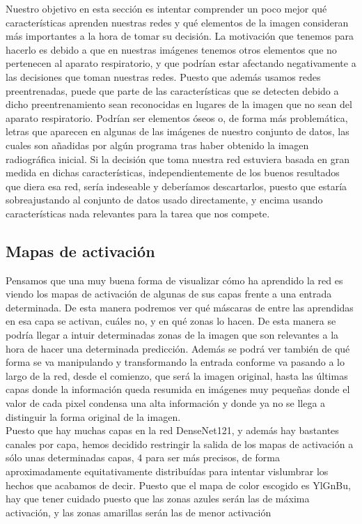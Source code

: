 \documentclass[11pt,a4paper]{article}
\theoremstyle{definition}
\begin{document}
Nuestro objetivo en esta sección es intentar comprender un poco mejor qué características aprenden nuestras redes y qué elementos de la imagen consideran más importantes a la hora de tomar su decisión.  La motivación que tenemos para hacerlo es debido a que en nuestras imágenes tenemos otros elementos que no pertenecen al aparato respiratorio, y que podrían estar afectando negativamente a las decisiones que toman nuestras redes. Puesto que además usamos redes preentrenadas, puede que parte de las características que se detecten debido a dicho preentrenamiento sean reconocidas en lugares de la imagen que no sean del aparato respiratorio. Podrían ser elementos óseos o, de forma más problemática, letras que aparecen en algunas de las imágenes de nuestro conjunto de datos, las cuales son añadidas por algún programa tras haber obtenido la imagen radiográfica inicial.  Si la decisión que toma nuestra red estuviera basada en gran medida en dichas características, independientemente de los buenos resultados que diera esa red, sería indeseable y deberíamos descartarlos, puesto que estaría sobreajustando al conjunto de datos usado directamente, y encima usando características nada relevantes para la tarea que nos compete.


\subsection{Mapas de activación}

Pensamos que una muy buena forma de visualizar cómo ha aprendido la red es viendo los mapas de activación de algunas de sus capas frente a una entrada determinada.  De esta manera podremos ver qué máscaras de entre las aprendidas en esa capa se activan, cuáles no, y en qué zonas lo hacen. De esta manera se podría llegar a intuir determinadas zonas de la imagen que son relevantes a la hora de hacer una determinada predicción.  Además se podrá ver también de qué forma se va manipulando y transformando la entrada conforme va pasando a lo largo de la red, desde el comienzo, que será la imagen original, hasta las últimas capas donde la información queda resumida en imágenes muy pequeñas donde el valor de cada pixel condensa una alta información y donde ya no se llega a distinguir la forma original de la imagen.\\

Puesto que hay muchas capas en la red DenseNet121, y además hay bastantes canales por capa, hemos decidido restringir la salida de los mapas de activación a sólo unas determinadas capas,  4 para ser más precisos, de forma aproximadamente equitativamente distribuídas para intentar vislumbrar los hechos que acabamos de decir.  Puesto que el mapa de color escogido es YlGnBu, hay que tener cuidado puesto que las zonas azules serán las de máxima activación, y las zonas amarillas serán las de menor activación\\
\end{document}

